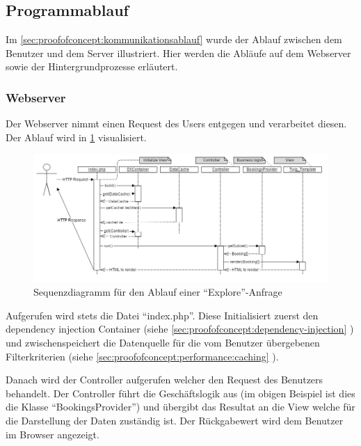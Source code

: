 \subsection{Programmablauf}
Im \cref{sec:proofofconcept:kommunikationsablauf} wurde der Ablauf zwischen dem Benutzer und dem Server illustriert. Hier werden die Abläufe auf dem Webserver sowie der Hintergrundprozesse erläutert.

\subsubsection{Webserver}
\label{sec:proofofconcept:architektur:webserver}
Der Webserver nimmt einen Request des Users entgegen und verarbeitet diesen. Der Ablauf wird in \cref{fig:proofofconcept:architektur:webserver:1} visualisiert.

\begin{figure}[H]
	\centering
	\includegraphics[width=1\textwidth]{images/diagram-sequence-controllers}
	\caption{Sequenzdiagramm für den Ablauf einer "`Explore"'-Anfrage}
	\label{fig:proofofconcept:architektur:webserver:1}
\end{figure}

Aufgerufen wird stets die Datei "`index.php"'. Diese Initialisiert zuerst den dependency injection Container (siehe \cref{sec:proofofconcept:dependency-injection} ) und zwischenspeichert die Datenquelle für die vom Benutzer übergebenen Filterkriterien (siehe \cref{sec:proofofconcept:performance:caching} ).

Danach wird der Controller aufgerufen welcher den Request des Benutzers behandelt. Der Controller führt die Geschäftslogik aus (im obigen Beispiel ist dies die Klasse "`BookingsProvider"') und übergibt das Resultat an die View welche für die Darstellung der Daten zuständig ist. Der Rückgabewert wird dem Benutzer im Browser angezeigt.

